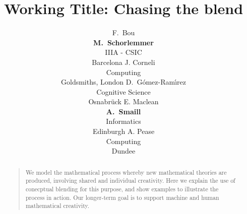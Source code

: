 \documentclass[letterpaper]{article}
\title{Working Title: Chasing the blend}
\author{F.\ Bou \\ \Large{\textbf{M.\ Schorlemmer}}\\IIIA - CSIC \\ Barcelona
        \And J. Corneli \\Computing \\Goldsmiths, London
        \And D.\ G{\'o}mez-Ram{\'{\i}}rez\\Cognitive Science \\Osnabr{\"u}ck
        \And E. Maclean \\\Large{\textbf{A.\ Smaill}}\\ Informatics\\ Edinburgh
        \And A. Pease \\ Computing \\ Dundee}
\begin{document}
 
\maketitle
\begin{abstract}
\begin{quote}
  We model the mathematical process whereby new mathematical theories
  are produced, involving shared and individual creativity.  Here we
  explain the use of conecptual blending for this purpose, and show
  examples to illustrate the process in action.  Our longer-term goal
  is to support machine and human mathematical creativity.
\end{quote}
\end{abstract}










\nocite{Weil60}
\nocite{Boden90}
\nocite{nunez05}
\nocite{Lak00}
\nocite{Gog05,Gog99}

\printbibliography
\end{document}
